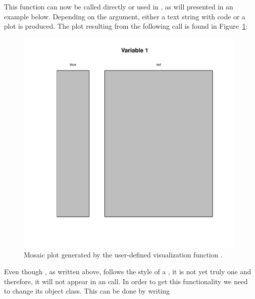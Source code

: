 \documentclass[article,shortnames]{jss}
\begin{document}
This function can now be called directly or used in , as will
presented in an example below. Depending on the  argument, either a text string
with code or a plot is produced. The plot resulting from the following
call is found in Figure~\ref{fig:mosaicPlot}:

\begin{Schunk}
\end{Schunk}

\begin{figure}
\begin{center}
\includegraphics[scale=0.2]{mosaicPlotExample.pdf}
\end{center}

\caption{Mosaic plot generated by the user-defined visualization
  function .}
\label{fig:mosaicPlot}
\end{figure}




Even though , as written above, follows the style of a
, it is not yet truly one and therefore, it will not
appear in an  call. In order to get this
functionality we need to change its object class. This can be done by
writing
\end{document}
